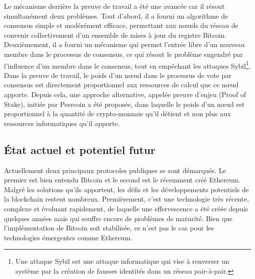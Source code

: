 \documentclass{tnreport}
\begin{document}
Le mécanisme derrière la preuve de travail a été une avancée car il résout simultanément deux problèmes. 
Tout d'abord, il a fourni un algorithme de consensus simple et modérément efficace, permettant aux nœuds du réseau de convenir collectivement d'un ensemble de mises à jour du registre Bitcoin. 
Deuxièmement, il a fourni un mécanisme qui permet l'entrée libre d'un nouveau membre dans le processus de consensus, ce qui résout le problème engendré par l'influence d'un membre dans le consensus, tout en empêchant les attaques Sybil\footnote{Une attaque Sybil est une attaque informatique qui vise à renverser un système par la création de fausses identités dans un réseau pair-à-pair.}. 
Dans la preuve de travail, le poids d'un nœud dans le processus de vote par consensus est directement proportionnel aux ressources de calcul que ce nœud apporte. 
Depuis cela, une approche alternative, appelée preuve d'enjeu (Proof of Stake), initiée par Peercoin\cite{peercoin} a été proposée, dans laquelle le poids d'un nœud est proportionnel à la quantité de crypto-monnaie qu'il détient et non plus aux ressources informatiques qu'il apporte.

\subsection{État actuel et potentiel futur}

Actuellement deux principaux protocoles publiques se sont démarqués. Le premier est bien entendu Bitcoin et le second est le récemment créé Ethereum. 
Malgré les solutions qu'ils apportent, les défis et les développements potentiels de la blockchain restent nombreux.
Premièrement, c'est une technologie très récente, complexe et évoluant rapidement, de laquelle une effervescence a été créée depuis quelques années mais qui souffre encore de problèmes de maturité.
Bien que l'implémentation de Bitcoin soit stabilisée, ce n'est pas le cas pour les technologies émergentes comme Ethereum.
\end{document}
